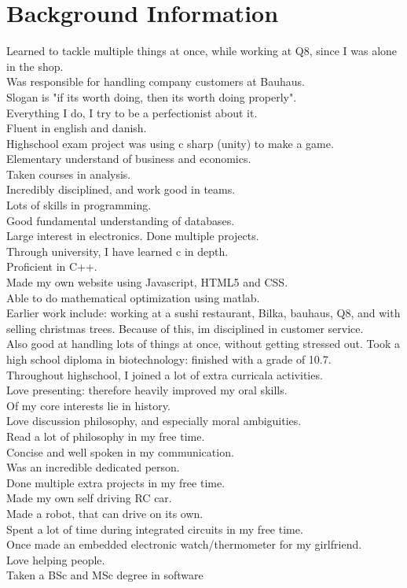 \section*{Background Information}
Learned to tackle multiple things at once, while working at Q8, since I was alone in the shop.\\Was responsible for handling company customers at Bauhaus.\\Slogan is "if its worth doing, then its worth doing properly".\\Everything I do, I try to be a perfectionist about it.\\Fluent in english and danish.\\Highschool exam project was using c sharp (unity) to make a game.\\Elementary understand of business and economics.\\Taken courses in analysis.\\Incredibly disciplined, and work good in teams.\\Lots of skills in programming.\\Good fundamental understanding of databases.\\Large interest in electronics. Done multiple projects.\\Through university, I have learned c in depth.\\Proficient in C++.\\Made my own website using Javascript, HTML5 and CSS.\\Able to do mathematical optimization using matlab.\\Earlier work include: working at a sushi restaurant, Bilka, bauhaus, Q8, and with selling christmas trees. Because of this, im disciplined in customer service.\\Also good at handling lots of things at once, without getting stressed out. Took a high school diploma in biotechnology: finished with a grade of 10.7.\\Throughout highschool, I joined a lot of extra curricala activities.\\Love presenting: therefore heavily improved my oral skills.\\Of my core interests lie in history.\\Love discussion philosophy, and especially moral ambiguities.\\Read a lot of philosophy in my free time.\\Concise and well spoken in my communication.\\Was an incredible dedicated person.\\Done multiple extra projects in my free time.\\Made my own self driving RC car.\\Made a robot, that can drive on its own.\\Spent a lot of time during integrated circuits in my free time.\\Once made an embedded electronic watch/thermometer for my girlfriend.\\Love helping people.\\Taken a BSc and MSc degree in software 